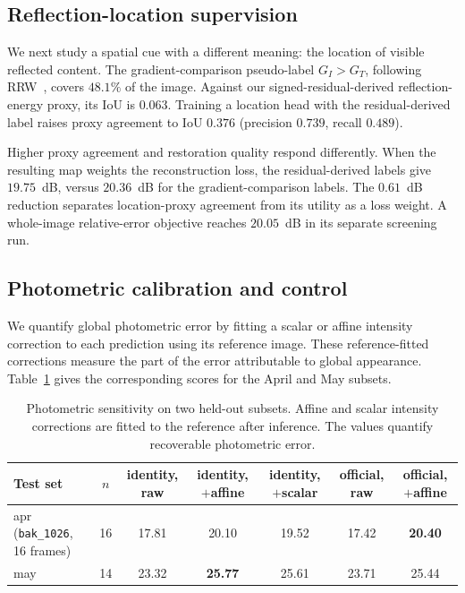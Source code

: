 \subsection{Reflection-location supervision}
\label{sec:gate}

We next study a spatial cue with a different
meaning: the location of visible reflected content.
The gradient-comparison pseudo-label
$G_I>G_T$, following RRW~\cite{zhu2024rrw},
covers $48.1\%$ of the image. Against our
signed-residual-derived reflection-energy proxy,
its IoU is $0.063$. Training a location head
with the residual-derived label raises proxy
agreement to IoU $0.376$ (precision $0.739$,
recall $0.489$).

Higher proxy agreement and restoration quality
respond differently. When the resulting map
weights the reconstruction loss, the
residual-derived labels give $19.75$~dB,
versus $20.36$~dB for the gradient-comparison
labels. The $0.61$~dB reduction separates
location-proxy agreement from its utility as
a loss weight. A whole-image relative-error
objective reaches $20.05$~dB in its
separate screening run.

\subsection{Photometric calibration and control}
\label{sec:photom}

We quantify global photometric error by fitting
a scalar or affine intensity correction to each
prediction using its reference image. These
reference-fitted corrections measure the part of
the error attributable to global appearance.
Table~\ref{tab:photometric} gives the corresponding
scores for the April and May subsets.


\begin{table}[t]
\centering
\caption{Photometric sensitivity on two held-out subsets.
Affine and scalar intensity corrections are fitted to the
reference after inference. The values quantify recoverable
photometric error.}
\label{tab:photometric}
\small
\setlength{\tabcolsep}{6pt}
\begin{tabular}{@{}lcccccc@{}}
\toprule
Test set & $n$ & identity, raw & identity, $+$affine & identity, $+$scalar
  & official, raw & official, $+$affine \\
\midrule
apr (\texttt{bak\_1026}, 16 frames) & 16 & 17.81 & 20.10 & 19.52
  & 17.42 & \textbf{20.40} \\
may & 14 & 23.32 & \textbf{25.77} & 25.61 & 23.71 & 25.44 \\
\bottomrule
\end{tabular}
\end{table}



